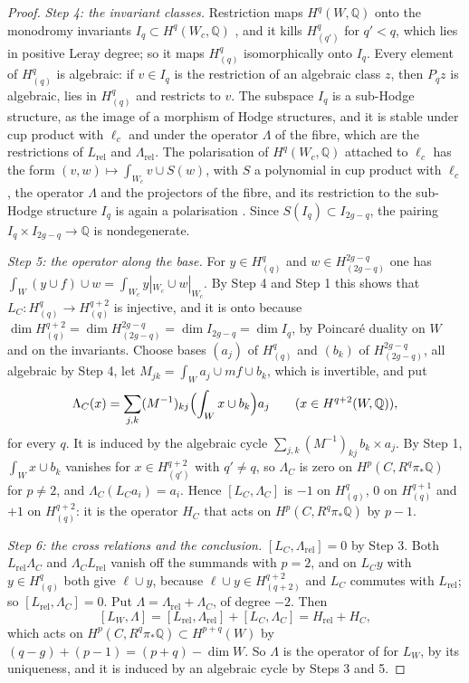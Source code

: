 \documentclass[11pt,reqno]{amsart}
\theoremstyle{plain}
\theoremstyle{definition}
\theoremstyle{remark}
\newcommand{\QQ}{\mathbb{Q}}
\begin{document}
\begin{proof}
\emph{Step 4: the invariant classes.} Restriction maps $H^{q}(W,\QQ)$ onto the
monodromy invariants $I_{q}\subset H^{q}(W_{c},\QQ)$ \cite[4.1.1(ii)]{Del71},
and it kills $H^{q}_{(q')}$ for $q'<q$, which lies in positive Leray degree;
so it maps $H^{q}_{(q)}$ isomorphically onto $I_{q}$. Every element of
$H^{q}_{(q)}$ is algebraic: if $v\in I_{q}$ is the restriction of an algebraic
class $z$, then $P_{q}z$ is algebraic, lies in $H^{q}_{(q)}$ and restricts to
$v$. The subspace $I_{q}$ is a sub-Hodge structure, as the image of a
morphism of Hodge structures, and it is stable under cup product with
$\ell_{c}$ and under the operator $\Lambda$ of the fibre, which are the
restrictions of $L_{\mathrm{rel}}$ and $\Lambda_{\mathrm{rel}}$. The
polarisation of $H^{q}(W_{c},\QQ)$ attached to $\ell_{c}$ has the form
$(v,w)\mapsto\int_{W_{c}}v\cup S(w)$, with $S$ a polynomial in cup product
with $\ell_{c}$, the operator $\Lambda$ and the projectors of the fibre, and
its restriction to the sub-Hodge structure $I_{q}$ is again a polarisation
\cite{Voi02}. Since $S(I_{q})\subset I_{2g-q}$, the pairing
$I_{q}\times I_{2g-q}\to\QQ$ is nondegenerate.

\emph{Step 5: the operator along the base.} For $y\in H^{q}_{(q)}$ and
$w\in H^{2g-q}_{(2g-q)}$ one has $\int_{W}(y\cup f)\cup w=\int_{W_{c}}
y|_{W_{c}}\cup w|_{W_{c}}$. By Step 4 and Step 1 this shows that
$L_{C}\colon H^{q}_{(q)}\to H^{q+2}_{(q)}$ is injective, and it is onto
because $\dim H^{q+2}_{(q)}=\dim H^{2g-q}_{(2g-q)}=\dim I_{2g-q}=\dim I_{q}$,
by Poincar\'e duality on $W$ and on the invariants. Choose bases $(a_{j})$ of
$H^{q}_{(q)}$ and $(b_{k})$ of $H^{2g-q}_{(2g-q)}$, all algebraic by Step 4,
let $M_{jk}=\int_{W}a_{j}\cup mf\cup b_{k}$, which is invertible, and put
\[
  \Lambda_{C}(x)=\sum_{j,k}(M^{-1})_{kj}\Bigl(\int_{W}x\cup b_{k}\Bigr)a_{j}
  \qquad(x\in H^{q+2}(W,\QQ)),
\]
for every $q$. It is induced by the algebraic cycle
$\sum_{j,k}(M^{-1})_{kj}\,b_{k}\times a_{j}$. By Step 1, $\int_{W}x\cup b_{k}$
vanishes for $x\in H^{q+2}_{(q')}$ with $q'\ne q$, so $\Lambda_{C}$ is zero
on $H^{p}(C,R^{q}\pi_{*}\QQ)$ for $p\ne2$, and $\Lambda_{C}(L_{C}a_{i})=a_{i}$.
Hence $[L_{C},\Lambda_{C}]$ is $-1$ on $H_{(q)}^{q}$, $0$ on
$H_{(q)}^{q+1}$ and $+1$ on $H_{(q)}^{q+2}$: it is the operator $H_{C}$ that
acts on $H^{p}(C,R^{q}\pi_{*}\QQ)$ by $p-1$.

\emph{Step 6: the cross relations and the conclusion.} $[L_{C},
\Lambda_{\mathrm{rel}}]=0$ by Step 3. Both $L_{\mathrm{rel}}\Lambda_{C}$ and
$\Lambda_{C}L_{\mathrm{rel}}$ vanish off the summands with $p=2$, and on
$L_{C}y$ with $y\in H^{q}_{(q)}$ both give $\ell\cup y$, because
$\ell\cup y\in H^{q+2}_{(q+2)}$ and $L_{C}$ commutes with $L_{\mathrm{rel}}$;
so $[L_{\mathrm{rel}},\Lambda_{C}]=0$. Put
$\Lambda=\Lambda_{\mathrm{rel}}+\Lambda_{C}$, of degree $-2$. Then
\[
  [L_{W},\Lambda]=[L_{\mathrm{rel}},\Lambda_{\mathrm{rel}}]+[L_{C},\Lambda_{C}]
  =H_{\mathrm{rel}}+H_{C},
\]
which acts on $H^{p}(C,R^{q}\pi_{*}\QQ)\subset H^{p+q}(W)$ by
$(q-g)+(p-1)=(p+q)-\dim W$. So $\Lambda$ is the operator of \cite[Definition~10.6]{paperI}
for $L_{W}$, by its uniqueness, and it is induced by an algebraic cycle by
Steps 3 and 5.
\end{proof}
\end{document}
